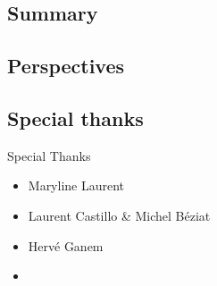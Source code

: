 \subsection{Summary}
\subsection{Perspectives}

\subsection{Special thanks}

\begin{frame}{Special Thanks}
    \begin{itemize}
        \item Maryline Laurent
        \item Laurent Castillo \& Michel Béziat
        \item Hervé Ganem
        \item 
    \end{itemize}
\end{frame}